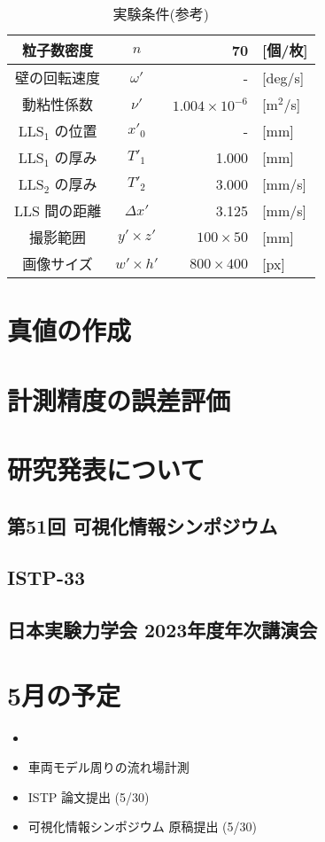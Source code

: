 \documentclass[twocolumn,a4j]{jsarticle}
\begin{document}
\begin{table}[hbtp]
    \label{table:data_type}
    \caption{実験条件(参考)}
    \centering
    \begin{tabular}{ c c | r l}
        \hline
        粒子数密度              & $n$            & 70                     & [個/枚]            \\ \hline
        壁の回転速度            & $\omega'$      & -                      & [deg/s]            \\ \hline
        動粘性係数              & $\nu'$         & $1.004 \times 10^{-6}$ & [$\mathrm{m}^2$/s] \\ \hline
        $\mathrm{LLS}_1$ の位置 & $x'_0$         & -                      & [mm]               \\ \hline
        $\mathrm{LLS}_1$ の厚み & $T'_1$         & 1.000                  & [mm]               \\ \hline
        $\mathrm{LLS}_2$ の厚み & $T'_2$         & 3.000                  & [mm/s]             \\ \hline
        LLS 間の距離            & $\Delta x'$    & 3.125                  & [mm/s]             \\ \hline
        撮影範囲                & $y' \times z'$ & $100 \times 50$        & [mm]               \\ \hline
        画像サイズ              & $w' \times h'$ & $800 \times 400$       & [px]               \\ \hline
    \end{tabular}
\end{table}


\section{真値の作成}


\section{計測精度の誤差評価}


\section{研究発表について}

\subsection{第51回 可視化情報シンポジウム}
\subsection{ISTP-33}
\subsection{日本実験力学会 2023年度年次講演会}


\section{5月の予定}
\begin{itemize}
    \item
    \item 車両モデル周りの流れ場計測
    \item ISTP 論文提出 (5/30)
    \item 可視化情報シンポジウム 原稿提出 (5/30)
\end{itemize}
\end{document}

